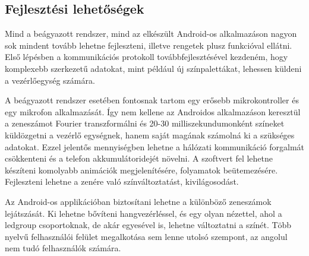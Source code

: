 \documentclass[../main.tex]{subfiles}
\begin{document}
    \subsection{Fejlesztési lehetőségek}
        Mind a beágyazott rendszer, mind az elkészült Android-os alkalmazáson nagyon sok mindent tovább lehetne fejleszteni, illetve rengetek plusz funkcióval ellátni. Első lépésben a kommunikációs protokoll továbbfejlesztésével kezdeném, hogy komplexebb szerkezetű adatokat, mint például új színpalettákat, lehessen küldeni a vezérlőegység számára.
        
        A beágyazott rendszer esetében fontosnak tartom egy erősebb mikrokontroller és egy mikrofon alkalmazását. Így nem kellene az Androidos alkalmazáson keresztül a zeneszámot Fourier transzformálni és 20-30 milliszekundumonként színeket küldözgetni a vezérlő egységnek, hanem saját magának számolná ki a szükséges adatokat. Ezzel jelentős mennyiségben lehetne a hálózati kommunikáció forgalmát csökkenteni és a telefon akkumulátoridejét növelni. A szoftvert fel lehetne készíteni komolyabb animációk megjelenítésére, folyamatok beütemezésére. Fejleszteni lehetne a zenére való színváltoztatást, kivilágosodást.
        
        Az Android-os applikációban biztosítani lehetne a különböző zeneszámok lejátszását. Ki lehetne bővíteni hangvezérléssel, és egy olyan nézettel, ahol a ledgroup csoportoknak, de akár egyesével is, lehetne változtatni a színét. Több nyelvű felhasználói felület megalkotása sem lenne utolsó szempont, az angolul nem tudó felhasználók számára. 
        
        
\end{document}
